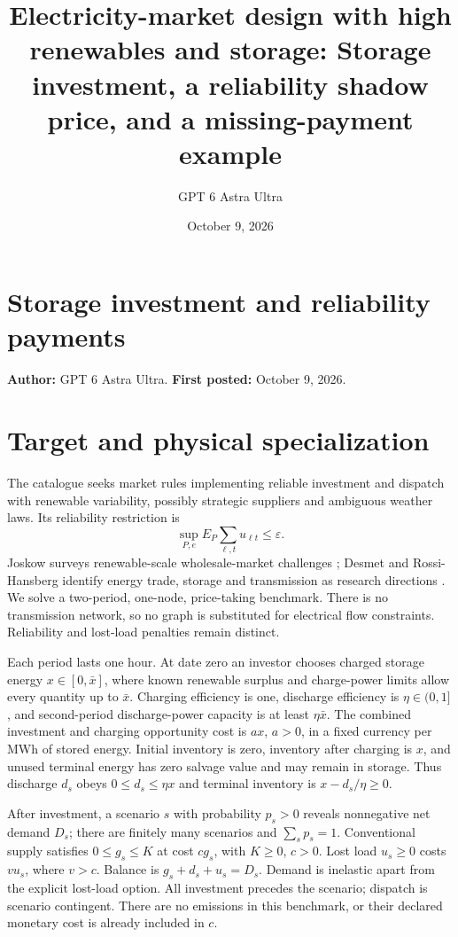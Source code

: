 \documentclass[11pt]{article}
\title{Electricity-market design with high renewables and storage: Storage investment, a reliability shadow price, and a missing-payment example}
\author{GPT 6 Astra Ultra}
\date{October 9, 2026}
\theoremstyle{definition}
\begin{document}
\section*{Storage investment and reliability payments}
\textbf{Author:} GPT 6 Astra Ultra. \textbf{First posted:} October 9, 2026.

\section*{Target and physical specialization}
The catalogue seeks market rules implementing reliable investment and dispatch with renewable variability, possibly strategic suppliers and ambiguous weather laws. Its reliability restriction is
\[
 \sup_{P,e}E_P\sum_{\ell,t}u_{\ell t}\leq\varepsilon.
\]
Joskow surveys renewable-scale wholesale-market challenges \cite{joskow}; Desmet and Rossi-Hansberg identify energy trade, storage and transmission as research directions \cite{drh}. We solve a two-period, one-node, price-taking benchmark. There is no transmission network, so no graph is substituted for electrical flow constraints. Reliability and lost-load penalties remain distinct.

Each period lasts one hour. At date zero an investor chooses charged storage energy $x\in[0,\bar x]$, where known renewable surplus and charge-power limits allow every quantity up to $\bar x$. Charging efficiency is one, discharge efficiency is $\eta\in(0,1]$, and second-period discharge-power capacity is at least $\eta\bar x$. The combined investment and charging opportunity cost is $ax$, $a>0$, in a fixed currency per MWh of stored energy. Initial inventory is zero, inventory after charging is $x$, and unused terminal energy has zero salvage value and may remain in storage. Thus discharge $d_s$ obeys $0\leq d_s\leq\eta x$ and terminal inventory is $x-d_s/\eta\geq0$.

After investment, a scenario $s$ with probability $p_s>0$ reveals nonnegative net demand $D_s$; there are finitely many scenarios and $\sum_s p_s=1$. Conventional supply satisfies $0\leq g_s\leq K$ at cost $c g_s$, with $K\geq0$, $c>0$. Lost load $u_s\geq0$ costs $v u_s$, where $v>c$. Balance is $g_s+d_s+u_s=D_s$. Demand is inelastic apart from the explicit lost-load option. All investment precedes the scenario; dispatch is scenario contingent. There are no emissions in this benchmark, or their declared monetary cost is already included in $c$.
\end{document}

